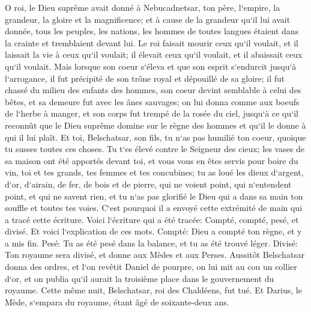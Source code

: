 \verse O roi, le Dieu suprême avait donné à Nebucadnetsar, ton père, l`empire, la grandeur, la gloire et la magnificence; 
\verse et à cause de la grandeur qu`il lui avait donnée, tous les peuples, les nations, les hommes de toutes langues étaient dans la crainte et tremblaient devant lui. Le roi faisait mourir ceux qu`il voulait, et il laissait la vie à ceux qu`il voulait; il élevait ceux qu`il voulait, et il abaissait ceux qu`il voulait. 
\verse Mais lorsque son coeur s`éleva et que son esprit s`endurcit jusqu`à l`arrogance, il fut précipité de son trône royal et dépouillé de sa gloire; 
\verse il fut chassé du milieu des enfants des hommes, son coeur devint semblable à celui des bêtes, et sa demeure fut avec les ânes sauvages; on lui donna comme aux boeufs de l`herbe à manger, et son corps fut trempé de la rosée du ciel, jusqu`à ce qu`il reconnût que le Dieu suprême domine sur le règne des hommes et qu`il le donne à qui il lui plaît. 
\verse Et toi, Belschatsar, son fils, tu n`as pas humilié ton coeur, quoique tu susses toutes ces choses. 
\verse Tu t`es élevé contre le Seigneur des cieux; les vases de sa maison ont été apportés devant toi, et vous vous en êtes servis pour boire du vin, toi et tes grands, tes femmes et tes concubines; tu as loué les dieux d`argent, d`or, d`airain, de fer, de bois et de pierre, qui ne voient point, qui n`entendent point, et qui ne savent rien, et tu n`as pas glorifié le Dieu qui a dans sa main ton souffle et toutes tes voies. 
\verse C`est pourquoi il a envoyé cette extrémité de main qui a tracé cette écriture. 
\verse Voici l`écriture qui a été tracée: Compté, compté, pesé, et divisé. 
\verse Et voici l`explication de ces mots. Compté: Dieu a compté ton règne, et y a mis fin. 
\verse Pesé: Tu as été pesé dans la balance, et tu as été trouvé léger. 
\verse Divisé: Ton royaume sera divisé, et donne aux Mèdes et aux Perses. 
\verse Aussitôt Belschatsar donna des ordres, et l`on revêtit Daniel de pourpre, on lui mit au cou un collier d`or, et on publia qu`il aurait la troisième place dans le gouvernement du royaume. 
\verse Cette même nuit, Belschatsar, roi des Chaldéens, fut tué. 
\verse Et Darius, le Mède, s`empara du royaume, étant âgé de soixante-deux ans. 

